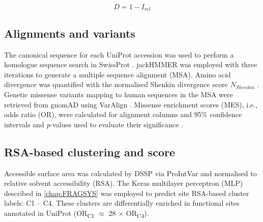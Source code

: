 \vspace{-12pt} %
\vspace{-12pt} %

\begin{equation}
D = 1 - I_{rel}
\label{eq:Irel_distance}
\end{equation}

\vspace{-12pt} %
\vspace{-12pt} %
\vspace{-12pt} %
\vspace{-12pt} %

\subsection{Alignments and variants}

The canonical sequence for each UniProt accession was used to perform a homologue sequence search in SwissProt \cite{BOUTET_2016_UNIPROT}. jackHMMER \cite{EDDY_1995_HMMER} was employed with three iterations to generate a multiple sequence alignment (MSA). Amino acid divergence was quantified with the normalised Shenkin \cite{SHENKIN_1991_SCORE} divergence score $N_{Shenkin}$ \cite{UTGES_2021_ANKS}. Genetic missense variants mapping to human sequences in the MSA were retrieved from gnomAD \cite{KARCZEWSKI_2020_GNOMAD} using VarAlign \cite{MACGOWAN_2017_VARIANTS}. Missense enrichment scores (MES), i.e., odds ratio (OR), were calculated for alignment columns \cite{MACGOWAN_2024_VARIANTS} and 95\% confidence intervals and \textit{p}-values used to evaluate their significance \cite{SZUMILAS_2010_ODDSRATIOS}.

\subsection{RSA-based clustering and score}

Accessible surface area was calculated by DSSP \cite{KABSCH_1983_DSSP} via ProIntVar \cite{MACGOWAN_2020_DRSASP} and normalised \cite{TIEN_2013_RSA} to relative solvent accessibility (RSA). The Keras \cite{CHOLLET_2015_KERAS} multilayer perceptron (MLP) \cite{CYBENKO_1989_MLP} described in \autoref{chap:FRAGSYS} \cite{UTGES_2024_FRAGSYS} was employed to predict site RSA-based cluster labels: C1 – C4. These clusters are differentially enriched in functional sites annotated in UniProt \cite{NIGHTINGALE_2017_API} (OR\textsubscript{C1} $\approx$ 28 $\times$ OR\textsubscript{C4}).

